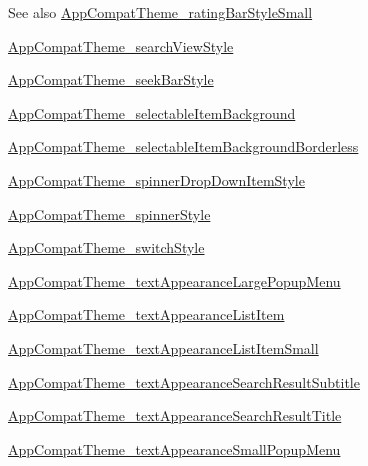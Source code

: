 \begin{DoxySeeAlso}{See also}
\hyperlink{classandroid_1_1support_1_1design_1_1R_1_1styleable_a2d2923d5071be320451a0bd71d92c8f6}{App\+Compat\+Theme\+\_\+rating\+Bar\+Style\+Small} 

\hyperlink{classandroid_1_1support_1_1design_1_1R_1_1styleable_a7f20a034b36b7ab747f54d15503472b8}{App\+Compat\+Theme\+\_\+search\+View\+Style} 

\hyperlink{classandroid_1_1support_1_1design_1_1R_1_1styleable_a3a0b8e9f055894c1859484655adc6db6}{App\+Compat\+Theme\+\_\+seek\+Bar\+Style} 

\hyperlink{classandroid_1_1support_1_1design_1_1R_1_1styleable_ad98a8eb57d72c1fb3c3e08668a810c3c}{App\+Compat\+Theme\+\_\+selectable\+Item\+Background} 

\hyperlink{classandroid_1_1support_1_1design_1_1R_1_1styleable_aece61d63468a2001739bbddff229db4f}{App\+Compat\+Theme\+\_\+selectable\+Item\+Background\+Borderless} 

\hyperlink{classandroid_1_1support_1_1design_1_1R_1_1styleable_a762707a1c6a6aa1a8ef4921392a1718d}{App\+Compat\+Theme\+\_\+spinner\+Drop\+Down\+Item\+Style} 

\hyperlink{classandroid_1_1support_1_1design_1_1R_1_1styleable_a2acd7c3695b4d10f59e576bf69cfb846}{App\+Compat\+Theme\+\_\+spinner\+Style} 

\hyperlink{classandroid_1_1support_1_1design_1_1R_1_1styleable_a3990aa9db190f4ae9a7169c7f468bcb7}{App\+Compat\+Theme\+\_\+switch\+Style} 

\hyperlink{classandroid_1_1support_1_1design_1_1R_1_1styleable_a9ce465853ff5c3303afda4d0d788d041}{App\+Compat\+Theme\+\_\+text\+Appearance\+Large\+Popup\+Menu} 

\hyperlink{classandroid_1_1support_1_1design_1_1R_1_1styleable_af9613bb433f8ea578ca10997d7f31384}{App\+Compat\+Theme\+\_\+text\+Appearance\+List\+Item} 

\hyperlink{classandroid_1_1support_1_1design_1_1R_1_1styleable_abc32a69cec9cd2518cfcbb996cbd9b21}{App\+Compat\+Theme\+\_\+text\+Appearance\+List\+Item\+Small} 

\hyperlink{classandroid_1_1support_1_1design_1_1R_1_1styleable_a5fb9efd1776571a8f6fb3e02b4b4602c}{App\+Compat\+Theme\+\_\+text\+Appearance\+Search\+Result\+Subtitle} 

\hyperlink{classandroid_1_1support_1_1design_1_1R_1_1styleable_aa3f93225ffeded406d20658eb3447964}{App\+Compat\+Theme\+\_\+text\+Appearance\+Search\+Result\+Title} 

\hyperlink{classandroid_1_1support_1_1design_1_1R_1_1styleable_a244ffcdac7c8cd9bada32939947ccf3d}{App\+Compat\+Theme\+\_\+text\+Appearance\+Small\+Popup\+Menu} 


\end{DoxySeeAlso}
